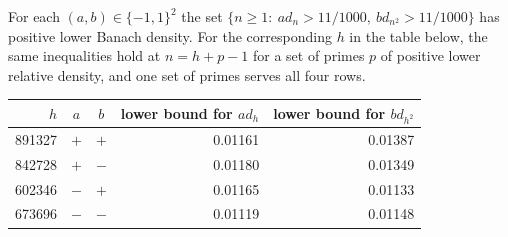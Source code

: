 \begin{corollary}\label{li:cor:signs}
For each $(a,b)\in\{-1,1\}^2$ the set $\{n\ge1:\ ad_n>11/1000,\ bd_{n^2}>11/1000\}$ has positive
lower Banach density. For the corresponding $h$ in the table below, the same inequalities hold
at $n=h+p-1$ for a set of primes $p$ of positive lower relative density, and one set of primes
serves all four rows.
\begin{center}\small
\begin{tabular}{rcc@{\qquad}rr}
\toprule
$h$ & $a$ & $b$ & lower bound for $ad_h$ & lower bound for $bd_{h^2}$\\
\midrule
891327 & $+$ & $+$ & 0.01161 & 0.01387\\
842728 & $+$ & $-$ & 0.01180 & 0.01349\\
602346 & $-$ & $+$ & 0.01165 & 0.01133\\
673696 & $-$ & $-$ & 0.01119 & 0.01148\\
\bottomrule
\end{tabular}
\end{center}
\end{corollary}

